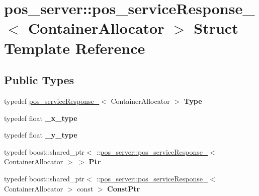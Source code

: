 \hypertarget{structpos__server_1_1pos__serviceResponse__}{}\section{pos\+\_\+server\+:\+:pos\+\_\+service\+Response\+\_\+$<$ Container\+Allocator $>$ Struct Template Reference}
\label{structpos__server_1_1pos__serviceResponse__}
\subsection*{Public Types}
\begin{DoxyCompactItemize}
\item 
\mbox{\label{structpos__server_1_1pos__serviceResponse___ac1059698e077097791de8570870298a8}} 
typedef \hyperlink{structpos__server_1_1pos__serviceResponse__}{pos\+\_\+service\+Response\+\_\+}$<$ Container\+Allocator $>$ {\bfseries Type}
\item 
\mbox{\label{structpos__server_1_1pos__serviceResponse___a59b014483a44fa404bc41fd713c0e4c8}} 
typedef float {\bfseries \+\_\+x\+\_\+type}
\item 
\mbox{\label{structpos__server_1_1pos__serviceResponse___a4b8c661c2164c21d4ca0fe304ce25afb}} 
typedef float {\bfseries \+\_\+y\+\_\+type}
\item 
\mbox{\label{structpos__server_1_1pos__serviceResponse___a8dc6b8c5f1647fa33b357031b9710429}} 
typedef boost\+::shared\+\_\+ptr$<$ \+::\hyperlink{structpos__server_1_1pos__serviceResponse__}{pos\+\_\+server\+::pos\+\_\+service\+Response\+\_\+}$<$ Container\+Allocator $>$ $>$ {\bfseries Ptr}
\item 
\mbox{\label{structpos__server_1_1pos__serviceResponse___a60304f8b1f731e5f962f24eca414766a}} 
typedef boost\+::shared\+\_\+ptr$<$ \+::\hyperlink{structpos__server_1_1pos__serviceResponse__}{pos\+\_\+server\+::pos\+\_\+service\+Response\+\_\+}$<$ Container\+Allocator $>$ const  $>$ {\bfseries Const\+Ptr}
\end{DoxyCompactItemize}

